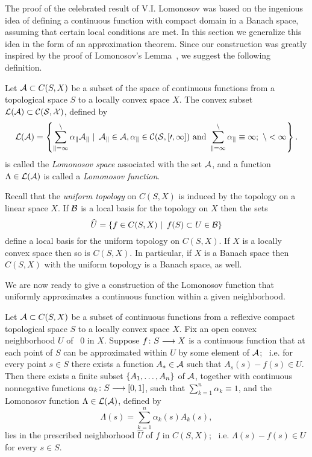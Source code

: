 The proof of the celebrated result of V.I. Lomonosov
\cite{Lom73,RR73} was based on the ingenious idea of defining a
continuous function with compact domain in a Banach space,
assuming that certain local conditions are met. In this section
we generalize this idea in the form of an approximation
theorem. Since our construction was greatly inspired by the
proof of Lomonosov's Lemma~\cite{Lom73,RR73}, we suggest the
following definition.

\begin{defn}
Let ${\cal A} \subset C(S,X)$ be a subset of the space of continuous
functions from a topological space $S$ to a locally convex
space $X$. The convex subset $\cal{L}({\cal A}) \subset C(S,X)$,
defined by
\[ \cal{L}({\cal A}) = \left\{ \sum_{k=1}^n \alpha_k A_k \,\,|\,\,\, A_k\in{\cal A},
   \alpha_k\in C(S,[0,1]) \text{ and } \sum_{k=1}^n\alpha_k \equiv 1;
   \,\, n < \infty\right\}. \]
is called the {\em Lomonosov space} associated with the set
${\cal A}$, and a function $\Lambda \in \cal{L}({\cal A})$ is called a {\em
Lomonosov function}.
\end{defn}

\medskip

Recall that the {\em uniform topology} on $C(S,X)$ is induced
by the topology on a linear space $X$. If $\cal{B}$ is a local
basis for the topology on $X$ then the sets
\[ \widehat{U}=\left\{f\in C(S,X) \,\,|\,\,\, f(S)\subset U\in\cal{B}\right\} \]
define a local basis for the uniform topology on $C(S,X)$. If
$X$ is a locally convex space then so is $C(S,X)$. In
particular, if $X$ is a Banach space then $C(S,X)$ with the
uniform topology is a Banach space, as well.

\medskip

We are now ready to give a construction of the Lomonosov
function that uniformly approximates a continuous function
within a given neighborhood.

\smallskip

\begin{lem} \label{l:APPROXI}
Let ${\cal A} \subset C(S,X)$ be a subset of continuous functions
from a reflexive compact topological space $S$ to a locally
convex space $X$. Fix an open convex neighborhood $U$ of \, $0$
in $X$. Suppose $f\colon{}S\longrightarrow{X}$ is a continuous function
that at each point of $S$ can be approximated within $U$ by
some element of ${\cal A}$; \, i.e. for every point $s \in S$ there
exists a function $A_s \in{\cal A}$ such that $A_s(s)-f(s)\in{U}$.
Then there exists a finite subset $\left\{A_1,\ldots,A_n\right\}$ of
${\cal A}$, together with continuous nonnegative functions
$\alpha_k\colon{}S\longrightarrow[0,1]$, such that
$\sum_{k=1}^n\alpha_k\equiv1$, and the Lomonosov function
$\Lambda\in\cal{L}({\cal A})$, defined by
\[ \Lambda(s) = \sum_{k=1}^n \alpha_k(s) A_k(s), \]
lies in the prescribed neighborhood $\widehat{U}$ of $f$ in
$C(S,X)$; \, i.e. $\Lambda(s)-f(s)\in{U}$ for every $s\in{S}$.
\end{lem}

